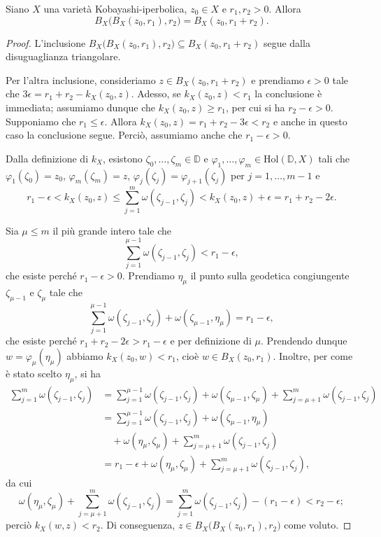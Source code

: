\begin{lm} \label{ballball}
    Siano $X$ una varietà Kobayashi-iperbolica, $z_0 \in X$ e $r_1,r_2>0$. Allora
    $$B_X\big(B_X(z_0,r_1),r_2\big)=B_X(z_0,r_1+r_2).$$
\end{lm}
\begin{proof}
    L'inclusione $B_X\big(B_X(z_0,r_1),r_2\big)\subseteq B_X(z_0,r_1+r_2)$ segue dalla disuguaglianza triangolare.

    Per l'altra inclusione, consideriamo $z \in B_X(z_0,r_1+r_2)$ e prendiamo $\epsilon>0$ tale che $3\epsilon=r_1+r_2-k_X(z_0,z)$. Adesso, se $k_X(z_0,z)<r_1$ la conclusione è immediata; assumiamo dunque che $k_X(z_0,z)\ge r_1$, per cui si ha $r_2-\epsilon>0$. Supponiamo che $r_1 \le \epsilon$. Allora $k_X(z_0,z)=r_1+r_2-3\epsilon<r_2$ e anche in questo caso la conclusione segue. Perciò, assumiamo anche che $r_1-\epsilon>0$.

    Dalla definizione di $k_X$, esistono $\zeta_0,\dots,\zeta_m \in \mathbb{D}$ e $\varphi_1,\dots,\varphi_m \in \text{Hol}(\mathbb{D},X)$ tali che $\varphi_1(\zeta_0)=z_0$, $\varphi_m(\zeta_m)=z$, $\varphi_j(\zeta_j)=\varphi_{j+1}(\zeta_j)$ per $j=1,\dots,m-1$ e
    $$r_1-\epsilon<k_X(z_0,z) \le \sum_{j=1}^m \omega(\zeta_{j-1},\zeta_j)<k_X(z_0,z)+\epsilon=r_1+r_2-2\epsilon.$$

    Sia $\mu \le m$ il più grande intero tale che
    $$\sum_{j=1}^{\mu-1} \omega(\zeta_{j-1},\zeta_j)<r_1-\epsilon,$$
    che esiste perché $r_1-\epsilon>0$. Prendiamo $\eta_{\mu}$ il punto sulla geodetica congiungente $\zeta_{\mu-1}$ e $\zeta_{\mu}$ tale che
    $$\sum_{j=1}^{\mu-1} \omega(\zeta_{j-1},\zeta_j)+\omega(\zeta_{\mu-1},\eta_{\mu})=r_1-\epsilon,$$
    che esiste perché $r_1+r_2-2\epsilon>r_1-\epsilon$ e per definizione di $\mu$. Prendendo dunque $w=\varphi_{\mu}(\eta_{\mu})$ abbiamo $k_X(z_0,w)<r_1$, cioè $w\in B_X(z_0,r_1)$. Inoltre, per come è stato scelto $\eta_{\mu}$, si ha
    \begin{align*}
        \sum_{j=1}^m \omega(\zeta_{j-1},\zeta_j)&=\sum_{j=1}^{\mu-1} \omega(\zeta_{j-1},\zeta_j)+\omega(\zeta_{\mu-1},\zeta_{\mu})+\sum_{j=\mu+1}^m \omega(\zeta_{j-1},\zeta_j)\\
        &=\sum_{j=1}^{\mu-1} \omega(\zeta_{j-1},\zeta_j)+\omega(\zeta_{\mu-1},\eta_{\mu})\\
        &\quad+\omega(\eta_{\mu},\zeta_{\mu})+\sum_{j=\mu+1}^m \omega(\zeta_{j-1},\zeta_j)\\
        &=r_1-\epsilon+\omega(\eta_{\mu},\zeta_{\mu})+\sum_{j=\mu+1}^m \omega(\zeta_{j-1},\zeta_j),
    \end{align*}
    da cui
    $$\omega(\eta_{\mu},\zeta_{\mu})+\sum_{j=\mu+1}^m \omega(\zeta_{j-1},\zeta_j)=\sum_{j=1}^m \omega(\zeta_{j-1},\zeta_j)-(r_1-\epsilon)<r_2-\epsilon;$$
    perciò $k_X(w,z)<r_2$. Di conseguenza, $z \in B_X\big(B_X(z_0,r_1),r_2\big)$ come voluto.
\end{proof}

